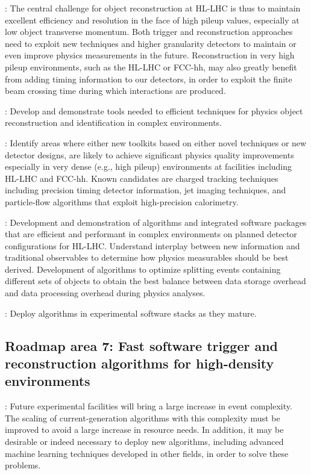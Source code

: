 : The central challenge for object reconstruction at HL-LHC is thus to maintain excellent efficiency and resolution in the face of high pileup values, especially at 
low object transverse momentum. Both trigger and reconstruction approaches need to exploit new techniques and higher granularity detectors to maintain or even improve physics measurements in the future.
Reconstruction in very high pileup environments, such as the HL-LHC or FCC-hh, may also greatly benefit from adding timing information to our detectors, in order to exploit the finite beam crossing time during which interactions are produced.

\vskip 0.5cm
: Develop and demonstrate tools needed to efficient techniques for physics object reconstruction and identification in complex environments.

\vskip 0.5cm
: Identify areas where either new toolkits based on either novel techniques or new detector designs, are likely to achieve significant physics quality 
improvements especially in very dense (e.g., high pileup) environments at facilities including HL-LHC and FCC-hh. Known candidates are charged tracking techniques including precision timing 
detector information, jet imaging techniques, and particle-flow algorithms that exploit high-precision calorimetry. 
 
\vskip 0.5cm
: Development and demonstration of algorithms and integrated software packages that are efficient and performant in complex environments on planned detector 
configurations for HL-LHC. Understand interplay between new information and traditional observables to determine how physics measurables should be best derived. Development of algorithms to 
optimize splitting events containing different sets of objects to obtain the best balance between data storage overhead and data processing overhead during physics analyses.

\vskip 0.5cm
: Deploy algorithms in experimental software stacks as they mature.

\subsection{Roadmap area 7: Fast software trigger and reconstruction algorithms for high-density environments}

: Future experimental facilities will bring a large increase in event complexity. The scaling of current-generation algorithms with this complexity must be improved 
to avoid a large increase in resource needs. In addition, it may be desirable or indeed necessary to deploy new algorithms, including advanced machine learning techniques developed in other fields, 
in order to solve these problems.

